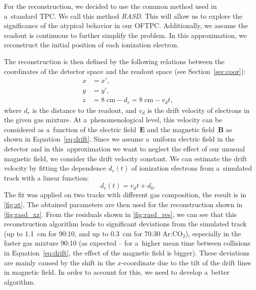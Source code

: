 		For the reconstruction, we decided to use the common method used in a~standard \ac{TPC}. We call this method \textit{\acf{RASD}}. This will allow us to explore the significance of the atypical behavior in our \ac{OFTPC}. Additionally, we assume the readout is continuous to further simplify the problem. In this approximation, we reconstruct the initial position of each ionization electron.
		
		The reconstruction is then defined by the following relations between the coordinates of the detector space and the readout space (see Section~\ref{sec:coor}):
			\begin{align}
				x &= x',\\
				y &= y',\\
				z &= 8\;\text{cm} - d_r = 8\;\text{cm} - v_d t,
			\end{align}
		where $d_r$ is the distance to the readout, and $v_d$ is the drift velocity of electrons in the given gas mixture. At a~phenomenological level, this velocity can be considered as a~function of the electric field~$\bm{E}$ and the magnetic field~$\bm{B}$ as shown in Equation~\ref{eq:drift}. Since we assume a~uniform electric field in the detector and in this~approximation we want to neglect the effect of our unusual magnetic field, we consider the drift velocity constant. We can estimate the drift velocity by fitting the dependence $d_r(t)$ of ionization electrons from a~simulated track with a linear function:
			\begin{equation}
				d_r(t) = v_d t + d_0.
			\end{equation}
		The fit was applied on two tracks with different gas composition, the result is in \cref{fig:zt}. The obtained parameters are then used for the reconstruction shown in \cref{fig:rasd_xz}. From the residuals shown in \cref{fig:rasd_res}, we can see that this reconstruction algorithm leads to significant deviations from the simulated track (up to 1.1~cm for 90:10, and up to 0.3~cm for 70:30 Ar:CO$_2$), especially in the faster gas mixture 90:10 (as expected -- for a~higher mean time between collisions in Equation~\ref{eq:drift}, the effect of the magnetic field is bigger). These deviations are mainly caused by the shift in the $x$\nobreakdash-coordinate due to the tilt of the drift lines in magnetic field. In order to account for this, we need to develop a~better algorithm.
		
